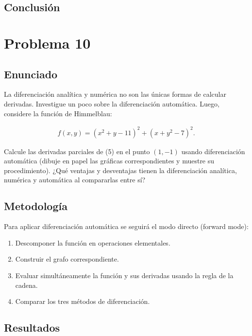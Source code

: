 \documentclass{article}
\begin{document}
\subsection{Conclusión}

\section{Problema 10}

\subsection{Enunciado}
La diferenciación analítica y numérica no son las únicas formas de calcular derivadas. Investigue un poco sobre la diferenciación automática. Luego, considere la función de Himmelblau:

\begin{align}
    f(x,y) = (x^{2} + y - 11)^{2} + (x + y^{2} - 7)^{2}. \tag{5}
\end{align}

Calcule las derivadas parciales de (5) en el punto $(1,-1)$ usando diferenciación automática (dibuje en papel las gráficas correspondientes y muestre su procedimiento). ¿Qué ventajas y desventajas tienen la diferenciación analítica, numérica y automática al compararlas entre sí?

\subsection{Metodología}

Para aplicar diferenciación automática se seguirá el modo directo (forward mode):
\begin{enumerate}
    \item Descomponer la función en operaciones elementales.
    \item Construir el grafo correspondiente.
    \item Evaluar simultáneamente la función y sus derivadas usando la regla de la cadena.
    \item Comparar los tres métodos de diferenciación.
\end{enumerate}

\subsection{Resultados}
\setcounter{equation}{0}
\end{document}
